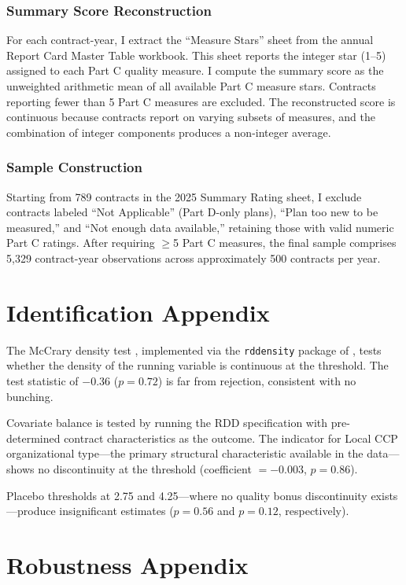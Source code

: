 \documentclass[12pt]{article}
\begin{document}
\subsubsection*{Summary Score Reconstruction} For each contract-year, I extract the ``Measure Stars'' sheet from the annual Report Card Master Table workbook. This sheet reports the integer star (1--5) assigned to each Part C quality measure. I compute the summary score as the unweighted arithmetic mean of all available Part C measure stars. Contracts reporting fewer than 5 Part C measures are excluded. The reconstructed score is continuous because contracts report on varying subsets of measures, and the combination of integer components produces a non-integer average.

\subsubsection*{Sample Construction} Starting from 789 contracts in the 2025 Summary Rating sheet, I exclude contracts labeled ``Not Applicable'' (Part D-only plans), ``Plan too new to be measured,'' and ``Not enough data available,'' retaining those with valid numeric Part C ratings. After requiring $\geq$5 Part C measures, the final sample comprises 5,329 contract-year observations across approximately 500 contracts per year.

\section{Identification Appendix}
\label{app:id}

The McCrary density test \citep{mccrary2008}, implemented via the \texttt{rddensity} package of \citet{cattaneo_rddensity2020}, tests whether the density of the running variable is continuous at the threshold. The test statistic of $-0.36$ ($p = 0.72$) is far from rejection, consistent with no bunching.

Covariate balance is tested by running the RDD specification with pre-determined contract characteristics as the outcome. The indicator for Local CCP organizational type---the primary structural characteristic available in the data---shows no discontinuity at the threshold (coefficient $= -0.003$, $p = 0.86$).

Placebo thresholds at 2.75 and 4.25---where no quality bonus discontinuity exists---produce insignificant estimates ($p = 0.56$ and $p = 0.12$, respectively).

\section{Robustness Appendix}
\label{app:robust}
\end{document}
